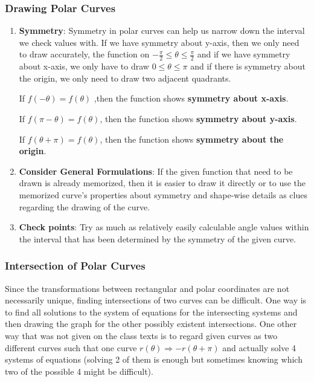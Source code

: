 \documentclass[12pt]{article}
\begin{document}
\subsubsection{Drawing Polar Curves}
\begin{enumerate}
\item \textbf{Symmetry}: Symmetry in polar curves can help us narrow down the interval we check values with. If we have symmetry about y-axis, then we only need to draw accurately, the function on $-\frac{\pi}{2}\leq \theta \leq \frac{\pi}{2}$ and if we have symmetry about x-axis, we only have to draw $0 \leq \theta \leq \pi$ and if there is symmetry about the origin, we only need to draw two adjacent quadrants.

If $f(-\theta)=f(\theta)$ ,then the function shows \textbf{symmetry about x-axis}.

If $f(\pi - \theta)=f(\theta)$, then the function shows \textbf{symmetry about y-axis}. 

If $f(\theta +\pi)=f(\theta)$, then the function shows \textbf{symmetry about the origin}.
\item \textbf{Consider General Formulations}: If the given function that need to be drawn is already memorized, then it is easier to draw it directly or to use the memorized curve's properties about symmetry and shape-wise details as clues regarding the drawing of the curve.
\item \textbf{Check points}: Try as much as relatively easily calculable angle values within the interval that has been determined by the symmetry of the given curve.

\end{enumerate}
\subsubsection{Intersection of Polar Curves}
Since the transformations between rectangular and polar coordinates are not necessarily unique, finding intersections of two curves can be difficult. One way is to find all solutions to the system of equations for the intersecting systems and then drawing the graph for the other possibly existent intersections. One other way that was not given on the class texts is to regard given curves as two different curves such that one curve $r(\theta) \Rightarrow -r(\theta +\pi)$ and actually solve 4 systems of equations (solving 2 of them is enough but sometimes knowing which two of the possible 4 might be difficult). 
\end{document}
